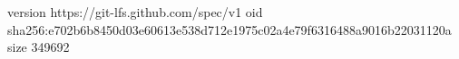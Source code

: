 version https://git-lfs.github.com/spec/v1
oid sha256:e702b6b8450d03e60613e538d712e1975c02a4e79f6316488a9016b22031120a
size 349692
